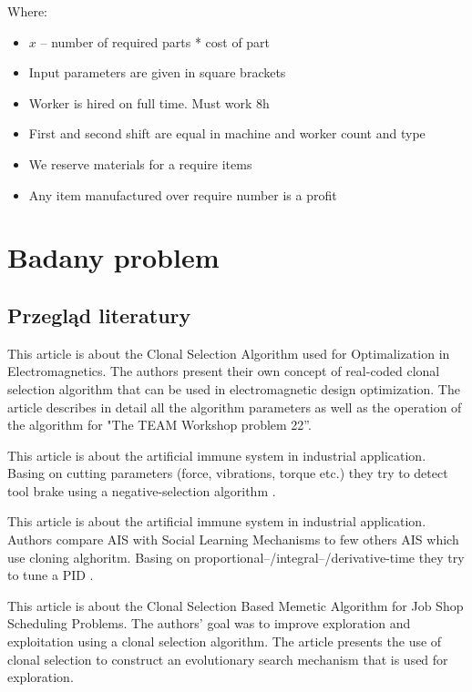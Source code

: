 \documentclass[a4paper]{article}
\begin{document}
Where:
\begin{itemize}
    \item $x$ -- number of required parts * cost of part
    \item Input parameters are given in square brackets
    \item Worker is hired on full time. Must work 8h
    \item First and second shift are equal in machine and worker count and type
    \item We reserve materials for a require items
    \item Any item manufactured over require number is a profit 
\end{itemize}


\section{Badany problem}
\subsection{Przegląd literatury}
This article is about the Clonal Selection Algorithm used for Optimalization in Electromagnetics. The authors present their own concept of real-coded clonal selection algorithm that can be used in electromagnetic design optimization. The article describes in detail all the algorithm parameters as well as the operation of the algorithm for "The TEAM Workshop problem 22”\cite{1430953}.



This article is about the artificial immune system in industrial application. Basing on cutting parameters (force, vibrations, torque etc.) they try to detect tool brake using a negative-selection algorithm \cite{dasgupta1999artificial}.



This article is about the artificial immune system in industrial application. Authors compare AIS with Social Learning Mechanisms to few others AIS which use cloning alghoritm. Basing on proportional–/integral–/derivative-time they try to tune a PID \cite{wang_artificial_2017}.



This article is about the Clonal Selection Based Memetic Algorithm for Job Shop Scheduling Problems. The authors' goal was to improve exploration and exploitation using a clonal selection algorithm. The article presents the use of clonal selection to construct an evolutionary search mechanism that is used for exploration\cite{yang2008clonal}.
\end{document}
